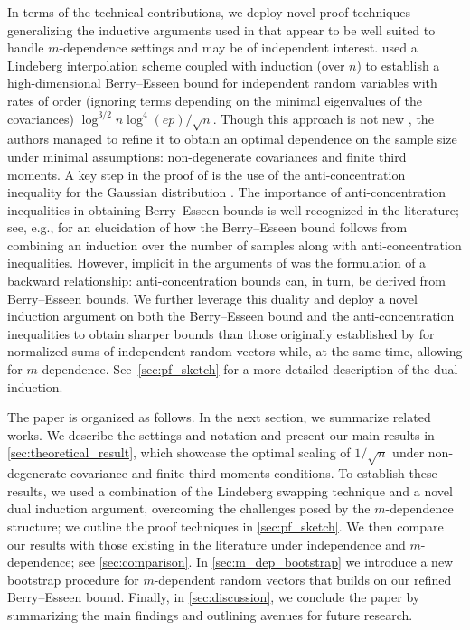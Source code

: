 \documentclass[aos]{imsart}
\begin{document}
In terms of the technical contributions, we deploy novel proof techniques generalizing the inductive arguments used in  that appear to be well suited to handle $m$-dependence settings and may be of independent interest. 
 used a Lindeberg interpolation scheme coupled with induction (over $n$) to establish a high-dimensional Berry--Esseen bound for independent random variables with rates of order (ignoring terms depending on the minimal eigenvalues of the covariances) $\log^{3/2}n\log^4(ep)/\sqrt{n}$. Though this approach is not new \citep[see, e.g.][]{SENATOV2011NORMAL,lopes2020central}, the authors managed to refine it to obtain an optimal dependence on the sample size under minimal assumptions: non-degenerate covariances and finite third moments. 
A key step in the proof of  is the use of the anti-concentration inequality for the Gaussian distribution \citep{nazarov2003maximal}. The importance of anti-concentration inequalities in obtaining Berry--Esseen bounds is well recognized in the literature; see, e.g., \citet{bentkus2000accuracy} for an elucidation of how the Berry--Esseen bound follows from combining an induction over the number of samples along with anti-concentration inequalities. However, implicit in  the arguments of  was the formulation of a backward relationship: anti-concentration bounds can, in turn, be derived from  Berry--Esseen bounds. We further leverage this duality and deploy a novel induction argument on both the Berry--Esseen bound and the anti-concentration inequalities to obtain sharper bounds than those originally established by  for normalized sums of independent random vectors while, at the same time, allowing for $m$-dependence. See~\cref{sec:pf_sketch} for a more detailed description of the dual induction. 



The paper is organized as follows. In the next section, we summarize related works. We describe the settings and notation and present our main results in \cref{sec:theoretical_result}, which showcase the optimal scaling of $1/\sqrt{n}$ under non-degenerate covariance and finite third moments conditions. To establish these results, we used a combination of the Lindeberg swapping technique and a novel dual induction argument, overcoming the challenges posed by the $m$-dependence structure; we outline the proof techniques in \cref{sec:pf_sketch}. We then compare our results with those existing in the literature under independence and $m$-dependence; see \cref{sec:comparison}. In \cref{sec:m_dep_bootstrap} we introduce a new bootstrap procedure for $m$-dependent random vectors that builds on our refined Berry--Esseen bound. Finally, in \cref{sec:discussion}, we conclude the paper by summarizing the main findings and outlining avenues for future research.
\end{document}
